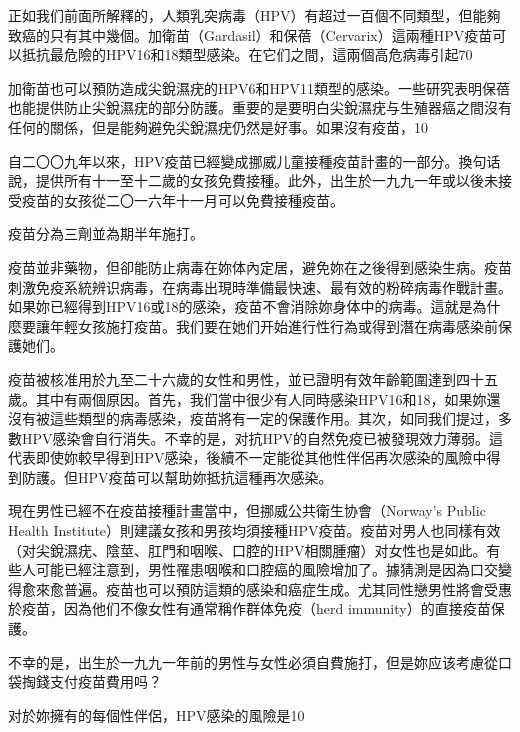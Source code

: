 \documentclass[12pt,UTF8]{ctexbook}
\begin{document}
正如我们前面所解釋的，人類乳突病毒（HPV）有超过一百個不同類型，但能夠致癌的只有其中幾個。加衛苗（Gardasil）和保蓓（Cervarix）這兩種HPV疫苗可以抵抗最危險的HPV16和18類型感染。在它们之間，這兩個高危病毒引起70%

加衛苗也可以預防造成尖銳濕疣的HPV6和HPV11類型的感染。一些研究表明保蓓也能提供防止尖銳濕疣的部分防護。重要的是要明白尖銳濕疣与生殖器癌之間沒有任何的關係，但是能夠避免尖銳濕疣仍然是好事。如果沒有疫苗，10%

自二〇〇九年以來，HPV疫苗已經變成挪威儿童接種疫苗計畫的一部分。換句话說，提供所有十一至十二歲的女孩免費接種。此外，出生於一九九一年或以後未接受疫苗的女孩從二〇一六年十一月可以免費接種疫苗。

疫苗分為三劑並為期半年施打。

疫苗並非藥物，但卻能防止病毒在妳体內定居，避免妳在之後得到感染生病。疫苗刺激免疫系統辨识病毒，在病毒出現時準備最快速、最有效的粉碎病毒作戰計畫。如果妳已經得到HPV16或18的感染，疫苗不會消除妳身体中的病毒。這就是為什麼要讓年輕女孩施打疫苗。我们要在她们开始進行性行為或得到潛在病毒感染前保護她们。

疫苗被核准用於九至二十六歲的女性和男性，並已證明有效年齡範圍達到四十五歲。其中有兩個原因。首先，我们當中很少有人同時感染HPV16和18，如果妳還沒有被這些類型的病毒感染，疫苗將有一定的保護作用。其次，如同我们提过，多數HPV感染會自行消失。不幸的是，对抗HPV的自然免疫已被發現效力薄弱。這代表即使妳較早得到HPV感染，後續不一定能從其他性伴侶再次感染的風險中得到防護。但HPV疫苗可以幫助妳抵抗這種再次感染。

現在男性已經不在疫苗接種計畫當中，但挪威公共衛生协會（Norway’s Public Health Institute）則建議女孩和男孩均須接種HPV疫苗。疫苗对男人也同樣有效（对尖銳濕疣、陰莖、肛門和咽喉、口腔的HPV相關腫瘤）对女性也是如此。有些人可能已經注意到，男性罹患咽喉和口腔癌的風險增加了。據猜測是因為口交變得愈來愈普遍。疫苗也可以預防這類的感染和癌症生成。尤其同性戀男性將會受惠於疫苗，因為他们不像女性有通常稱作群体免疫（herd immunity）的直接疫苗保護。

不幸的是，出生於一九九一年前的男性与女性必須自費施打，但是妳应该考慮從口袋掏錢支付疫苗費用吗？

对於妳擁有的每個性伴侶，HPV感染的風險是10%
\end{document}
